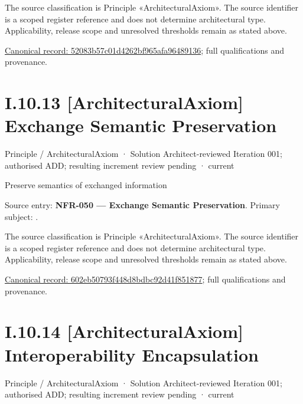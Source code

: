 The source classification is Principle «ArchitecturalAxiom». The source identifier is a scoped register reference and does not determine architectural type. Applicability, release scope and unresolved thresholds remain as stated above.


{\footnotesize \href{../../../../../../../../continuum/motivation/principle/architectural-axiom/52083b57c01d4262bf965afa96489136.md}{Canonical record: 52083b57c01d4262bf965afa96489136}; full qualifications and provenance.}\par
\section*{I.10.13 [ArchitecturalAxiom] Exchange Semantic Preservation}
\label{navigation:I.10.13}

\label{element:602eb50793f448d8bdbc92d41f851877}
{\small Principle / ArchitecturalAxiom · Solution Architect-reviewed Iteration 001; authorised ADD; resulting increment review pending · current}\par

Preserve semantics of exchanged information



Source entry: \textbf{NFR-050 — Exchange Semantic Preservation}. Primary subject: \texttt{}.



The source classification is Principle «ArchitecturalAxiom». The source identifier is a scoped register reference and does not determine architectural type. Applicability, release scope and unresolved thresholds remain as stated above.


{\footnotesize \href{../../../../../../../../continuum/motivation/principle/architectural-axiom/602eb50793f448d8bdbc92d41f851877.md}{Canonical record: 602eb50793f448d8bdbc92d41f851877}; full qualifications and provenance.}\par
\section*{I.10.14 [ArchitecturalAxiom] Interoperability Encapsulation}
\label{navigation:I.10.14}

\label{element:e9e0b4f82b6544e7ba87651c578d82c2}
{\small Principle / ArchitecturalAxiom · Solution Architect-reviewed Iteration 001; authorised ADD; resulting increment review pending · current}\par

